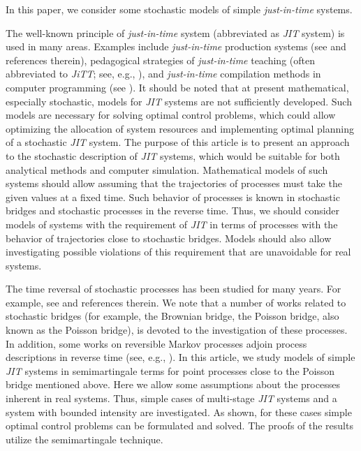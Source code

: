 \makeentitle










In this paper, we consider some stochastic models of simple \emph{just-in-time} systems. 

The well-known principle of \emph{just-in-time} system (abbreviated as \emph{JIT} system) is used in many areas. Examples include \emph{just-in-time} production systems (see \cite{sugimori, yavuz} and references therein), pedagogical strategies of \emph{just-in-time} teaching (often abbreviated to \emph{JiTT}; see, e.g., \cite{killi, mcgee}), and \emph{just-in-time} compilation methods in computer programming (see \cite{aycock, pape}). It should be noted that at present mathematical, especially stochastic, models for \emph{JIT} systems are not sufficiently developed. Such models are necessary for solving optimal control problems, which could allow optimizing the allocation of system resources and implementing optimal planning of a stochastic \emph{JIT} system. The purpose of this article is to present an approach to the stochastic description of \emph{JIT} systems, which would be suitable for both analytical methods and computer simulation. Mathematical models of such systems should allow assuming that the trajectories of processes must take the given values at a fixed time. Such behavior of processes is known in stochastic bridges and stochastic processes in the reverse time. Thus, we should consider models of systems with the requirement of \emph{JIT} in terms of processes with the behavior of trajectories close to stochastic bridges. Models should also allow investigating possible violations of this requirement that are unavoidable for real systems.



The time reversal of stochastic processes has been studied for many years. For example, see \cite{follmer, jacod,  elliott,  privault} and references therein. We note that a number of works related to stochastic bridges (for example, the Brownian bridge, the Poisson bridge, also known as the Poisson bridge), is devoted to the investigation of these processes. In addition, some works on reversible Markov processes adjoin process descriptions in reverse time (see, e.g., \cite{longla}). In this article, we study models of simple \emph{JIT} systems in semimartingale terms for point processes close to the Poisson bridge mentioned above. Here we allow some assumptions about the processes inherent in real systems. Thus, simple cases of multi-stage \emph{JIT} systems and a system with bounded intensity are investigated. As shown, for these cases simple optimal control problems can be formulated and solved. The proofs of the results utilize the semimartingale technique.




